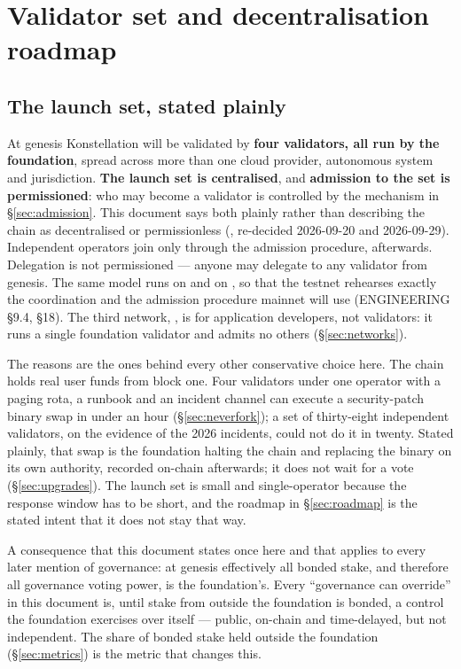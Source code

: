 \section{Validator set and decentralisation roadmap}
\label{sec:validators}

\subsection{The launch set, stated plainly}

At genesis Konstellation will be validated by \textbf{four validators, all run
by the foundation}, spread across more than one cloud provider, autonomous
system and jurisdiction. \textbf{The launch set is centralised},
and \textbf{admission to the set is permissioned}: who may become a validator
is controlled by the mechanism in \S\ref{sec:admission}. This document says
both plainly rather than describing the chain as decentralised or
permissionless (, re-decided 2026-09-20 and 2026-09-29). Independent operators join
only through the admission procedure, afterwards. Delegation is not
permissioned --- anyone may delegate \kash{} to any validator from genesis.
The same model runs on  and on , so that
the testnet rehearses exactly the coordination and the admission procedure
mainnet will use (ENGINEERING \S9.4, \S18). The third network,
, is for application developers, not validators: it runs a
single foundation validator and admits no others (\S\ref{sec:networks}).

The reasons are the ones behind every other conservative choice here. The chain
holds real user funds from block one. Four validators under one operator with a
paging rota, a runbook and an incident channel can execute a security-patch
binary swap in under an hour (\S\ref{sec:neverfork}); a set of thirty-eight
independent validators, on the evidence of the 2026 incidents, could not do it
in twenty. Stated plainly, that swap is the foundation halting the chain and
replacing the binary on its own authority, recorded on-chain afterwards; it
does not wait for a vote (\S\ref{sec:upgrades}). The launch set is small and
single-operator because the response window has to be short, and the roadmap
in \S\ref{sec:roadmap} is the stated intent that it does not stay that way.

A consequence that this document states once here and that applies to every
later mention of governance: at genesis effectively all bonded stake, and
therefore all governance voting power, is the foundation's. Every ``governance
can override'' in this document is, until stake from outside the foundation
is bonded, a control the foundation exercises over itself --- public,
on-chain and time-delayed, but not independent. The share of bonded stake
held outside the foundation (\S\ref{sec:metrics}) is the metric that changes
this.

